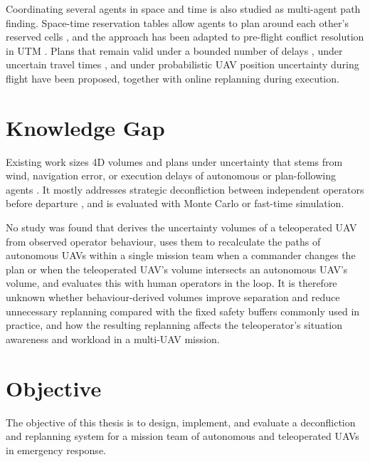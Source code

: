 \documentclass{article}
\begin{document}
Coordinating several agents in space and time is also studied as multi-agent path finding.
Space-time reservation tables allow agents to plan around each other's reserved cells \cite{silver2005}, and the approach has been adapted to pre-flight conflict resolution in UTM \cite{ho2022mapf}.
Plans that remain valid under a bounded number of delays \cite{atzmon2020robust}, under uncertain travel times \cite{shahar2021safe}, and under probabilistic UAV position uncertainty during flight \cite{chen2025inflight} have been proposed, together with online replanning during execution.

\section{Knowledge Gap}
Existing work sizes 4D volumes and plans under uncertainty that stems from wind, navigation error, or execution delays of autonomous or plan-following agents \cite{pradeep2025wind, cardenas2024confidence, atzmon2020robust, shahar2021safe, chen2025inflight}.
It mostly addresses strategic deconfliction between independent operators before departure \cite{astmf3548, ho2022mapf}, and is evaluated with Monte Carlo or fast-time simulation.

No study was found that derives the uncertainty volumes of a teleoperated UAV from observed operator behaviour, uses them to recalculate the paths of autonomous UAVs within a single mission team when a commander changes the plan or when the teleoperated UAV's volume intersects an autonomous UAV's volume, and evaluates this with human operators in the loop.
It is therefore unknown whether behaviour-derived volumes improve separation and reduce unnecessary replanning compared with the fixed safety buffers commonly used in practice, and how the resulting replanning affects the teleoperator's situation awareness and workload in a multi-UAV mission.

\section{Objective}
The objective of this thesis is to design, implement, and evaluate a deconfliction and replanning system for a mission team of autonomous and teleoperated UAVs in emergency response.
\end{document}
